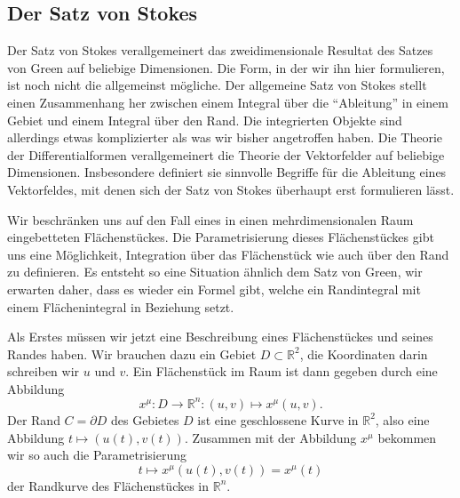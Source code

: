 \subsection{Der Satz von Stokes%
\label{skript:kruemmung:section:stokes}}
Der Satz von Stokes verallgemeinert das zweidimensionale Resultat des
Satzes von Green auf beliebige Dimensionen.
Die Form, in der wir ihn hier formulieren, ist noch nicht die allgemeinst
mögliche.
Der allgemeine Satz von Stokes stellt einen Zusammenhang her zwischen
einem Integral über die ``Ableitung'' in einem Gebiet und einem
Integral über den Rand.
Die integrierten Objekte sind allerdings etwas komplizierter als was
wir bisher angetroffen haben.
Die Theorie der Differentialformen verallgemeinert die Theorie der
Vektorfelder auf beliebige Dimensionen.
Insbesondere definiert sie sinnvolle Begriffe für die Ableitung eines
Vektorfeldes, mit denen sich der Satz von Stokes überhaupt erst formulieren
lässt.

Wir beschränken uns auf den Fall eines in einen mehrdimensionalen Raum
eingebetteten Flächen\-stückes.
Die Parametrisierung dieses Flächenstückes gibt uns eine Möglichkeit,
Integration über das Flächen\-stück wie auch über den Rand zu definieren.
Es entsteht so eine Situation ähnlich dem Satz von Green, wir erwarten
daher, dass es wieder ein Formel gibt, welche ein Randintegral mit einem
Flächenintegral in Beziehung setzt.


Als Erstes müssen wir jetzt eine Beschreibung eines Flächenstückes
und seines Randes haben.
Wir brauchen dazu ein Gebiet $D\subset\mathbb R^2$, die Koordinaten darin
schreiben wir $u$ und $v$.
Ein Flächenstück im Raum ist dann gegeben durch eine Abbildung
\[
x^\mu\colon D\to \mathbb R^n\colon (u,v)\mapsto x^\mu(u,v).
\]
Der Rand $C=\partial D$ des Gebietes $D$ ist eine geschlossene Kurve
in $\mathbb R^2$, also eine Abbildung $t\mapsto (u(t),v(t))$.
Zusammen mit der Abbildung $x^\mu$ bekommen wir so auch die Parametrisierung
\[
t\mapsto x^\mu(u(t),v(t)) = x^\mu(t)
\]
der Randkurve des Flächenstückes in $\mathbb R^n$.

